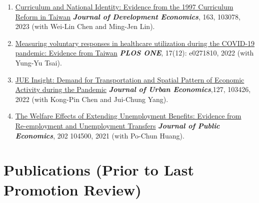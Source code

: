 \documentclass[10pt,letterpaper]{article}
\begin{document}
\begin{enumerate}
\item
\href{https://www.dropbox.com/s/lz3pqw0rozyn68r/knowing_taiwan_ver_2017_08_tzu_ting_v58.pdf?dl=0}{Curriculum and National Identity: Evidence from the 1997 Curriculum Reform in Taiwan} \textit{\textbf{Journal of Development Economics}}, 163, 103078, 2023 (with Wei-Lin Chen and Ming-Jen Lin).

\item
\href{https://doi.org/10.1371/journal.pone.0271810}{Measuring voluntary responses in healthcare utilization during the COVID-19 pandemic: Evidence from Taiwan}  \textit{\textbf{PLOS ONE}}, 17(12): e0271810, 2022 (with Yung-Yu Tsai).

\item
\href{https://www.dropbox.com/s/etfzl98k6d83ef5/Spontaneous_Population_Mobility_v23.pdf?dl=0}{JUE Insight: Demand for Transportation and Spatial Pattern of Economic Activity during the Pandemic} \textit{\textbf{Journal of Urban Economics}},127, 103426, 2022 (with Kong-Pin Chen and Jui-Chung Yang).

\item
\href{https://www.dropbox.com/s/4bmmsvl2mko0thu/Optimal_UI_Tzu_Ting_v142.pdf?dl=0}{The Welfare Effects of Extending Unemployment Benefits: Evidence from Re-­employment and Unemployment Transfers} \textit{\textbf{Journal of Public Economics}}, 202 104500, 2021 (with Po-Chun Huang).

\end{enumerate}

\section*{\textbf{Publications (Prior to Last Promotion Review)}}
\end{document}
